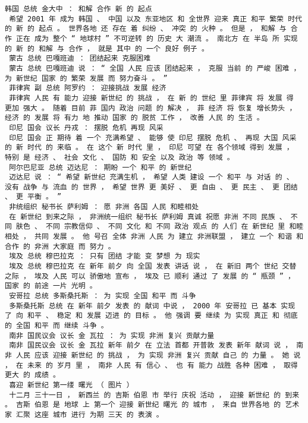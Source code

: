 \documentclass{article}
\begin{document}
\begin{Verbatim}[commandchars=\\\{\}]
 韩国 总统 金大中 ： 和解 合作 新 的 起点 
 希望 2001 年 成为 韩国 、 中国 以及 东亚地区 和 全世界 迎来 真正 和平 繁荣 时代 的 新 的 起点 。 世界各地 还 存在 着 纠纷 、 冲突 的 火种 。 但是 ， 和解 与 合作 正在 成为 整个 “ 地球村 ” 不可逆转 的 历史 大 潮流 。 南北方 在 半岛 所 实现 的 新 的 和解 与 合作 ， 就是 其中 的 一个 良好 例子 。 
 蒙古 总统 巴嘎班迪 ： 团结起来 克服困难 
 蒙古 总统 巴嘎班迪 说 ： “ 全国 人民 应该 团结起来 ， 克服 当前 的 严峻 困难 ， 为 新世纪 国家 的 繁荣 发展 而 努力奋斗 。 ” 
 菲律宾 副 总统 阿罗约 ： 迎接挑战 发展 经济 
 菲律宾 人民 有 能力 迎接 新世纪 的 挑战 ， 在 新 的 世纪 里 菲律宾 将 发展 得 更加 强大 。 随着 目前 菲 国内 政治 问题 的 解决 ， 菲 经济 将 恢复 增长势头 ， 经济 的 发展 将 有力 地 推动 国家 的 脱贫 工作 ， 改善 人民 的 生活 。 
 印尼 国会 议长 丹戎 ： 摆脱 危机 再现 风采 
 印尼 国会 正 期待 着 一个 充满希望 、 能够 使 印尼 摆脱 危机 、 再现 大国 风采 的 新 时代 的 来临 。 在 这个 新 时代 里 ， 印尼 可望 在 各个领域 得到 发展 ， 特别 是 经济 、 社会 文化 、 国防 和 安全 以及 政治 等 领域 。 
 阿尔巴尼亚 总统 迈达尼 ： 期盼 一个 和平 的 新世纪 
 迈达尼 说 ： “ 希望 新世纪 充满生机 ， 希望 人类 建设 一个 和平 与 对话 的 、 没有 战争 与 流血 的 世界 ， 希望 世界 更 美好 、 更 自由 、 更 民主 、 更 团结 、 更 平衡 。 ” 
 非统组织 秘书长 萨利姆 ： 愿 非洲 各国 人民 和睦相处 
 在 新世纪 到来之际 ， 非洲统一组织 秘书长 萨利姆 真诚 祝愿 非洲 不同 民族 、 不同 肤色 、 不同 宗教信仰 、 不同 文化 和 不同 政治 观点 的 人们 在 新世纪 里 和睦相处 ， 共同 发展 。 他 号召 全体 非洲 人民 为 建立 非洲联盟 ， 建立 一个 和谐 和 合作 的 非洲 大家庭 而 努力 。 
 埃及 总统 穆巴拉克 ： 只有 团结 才能 变 梦想 为 现实 
 埃及 总统 穆巴拉克 在 新年 前夕 向 全国 发表 讲话 说 ， 在 新旧 两个 世纪 交替 之际 ， 埃及 人民 可以 骄傲地 宣布 ， 埃及 已 顺利 通过 了 发展 的 “ 瓶颈 ” ， 国家 的 前途 一片 光明 。 
 安哥拉 总统 多斯桑托斯 ： 为 实现 全国 和平 而 斗争 
 多斯桑托斯 总统 在 新年 前夕 发表 的 献词 中说 ， 2000 年 安哥拉 已 基本 实现 了 向 和平 、 稳定 和 发展 迈进 的 目标 。 他 强调 要 继续 为 实现 真正 和 彻底 的 全国 和平 而 继续 斗争 。 
 南非 国民议会 议长 金 瓦拉 ： 为 实现 非洲 复兴 贡献力量 
 南非 国民议会 议长 金 瓦拉 新年 前夕 在 立法 首都 开普敦 发表 新年 献词 说 ， 南非 人民 应该 迎接 新世纪 的 挑战 ， 为 实现 非洲 复兴 贡献 自己 的 力量 。 她 说 ， 在 未来 的 岁月 里 ， 南非 人民 有 信心 、 也 有 能力 战胜 各种 困难 ， 取得 更大 的 成绩 。 
 喜迎 新世纪 第一缕 曙光 （ 图片 ） 
 十二月 三十一日 ， 新西兰 的 吉斯 伯恩 市 举行 庆祝 活动 ， 迎接 新世纪 的 到来 。 吉斯 伯恩 是 地球 上 第一个 迎接 新世纪 曙光 的 城市 ， 来自 世界各地 的 艺术家 汇聚 这座 城市 进行 为期 三天 的 表演 。 

\end{Verbatim}
\end{document}
